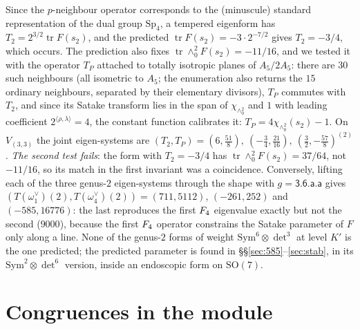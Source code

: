 \documentclass[11pt]{amsart}
\theoremstyle{definition}
\begin{document}
Since the $p$-neighbour operator corresponds to the (minuscule) standard representation of the dual group $\mathrm{Sp}_4$, a tempered eigenform has $T_2=2^{3/2}\operatorname{tr}F(s_2)$, and the predicted $\operatorname{tr}F(s_2)=-3\cdot2^{-7/2}$ gives $T_2=-3/4$, which occurs. The prediction also fixes $\operatorname{tr}\wedge^2_0F(s_2)=-11/16$, and we tested it with the operator $T_P$ attached to totally isotropic planes of $A_5/2A_5$: there are $30$ such neighbours (all isometric to $A_5$; the enumeration also returns the $15$ ordinary neighbours, separated by their elementary divisors), $T_P$ commutes with $T_2$, and since its Satake transform lies in the span of $\chi_{\wedge^2_0}$ and $1$ with leading coefficient $2^{\langle\rho,\lambda\rangle}=4$, the constant function calibrates it: $T_P=4\chi_{\wedge^2_0}(s_2)-1$. On $V_{(3,3)}$ the joint eigen-systems are $(T_2,T_P)=(6,\tfrac{51}{8}),\ (-\tfrac34,\tfrac{21}{16}),\ (\tfrac32,-\tfrac{57}{8})^{(2)}$. \emph{The second test fails}: the form with $T_2=-3/4$ has $\operatorname{tr}\wedge^2_0F(s_2)=37/64$, not $-11/16$, so its match in the first invariant was a coincidence. Conversely, lifting each of the three genus-$2$ eigen-systems through the shape with $g=\textsf{3.6.a.a}$ gives $(T(\omega_1^\vee)(2),T(\omega_4^\vee)(2))=(711,5112)$, $(-261,252)$ and $(-585,16776)$: the last reproduces the first $F_4$ eigenvalue exactly but not the second ($9000$), because the first $F_4$ operator constrains the Satake parameter of $F$ only along a line. None of the genus-$2$ forms of weight $\mathrm{Sym}^6\otimes\det^3$ at level $K'$ is the one predicted; the predicted parameter is found in \S\S\ref{sec:585}--\ref{sec:stab}, in its $\mathrm{Sym}^2\otimes\det^6$ version, inside an endoscopic form on $\mathrm{SO}(7)$.

\section{Congruences in the module}\label{sec:cong}
\end{document}
